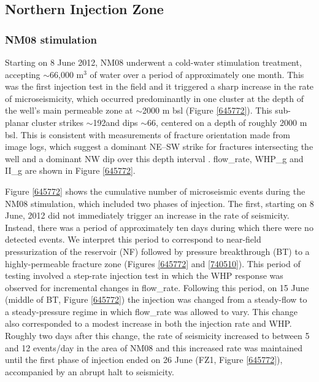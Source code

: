 \subsection{Northern Injection Zone}
\subsubsection{NM08 stimulation}\label{NM08_stimulation}
Starting on 8 June 2012, NM08 underwent a cold-water \gls{stimulation} treatment, accepting $\sim$66,000 m$^3$ of water over a period of approximately one month. This was the first injection test in the field and it triggered a sharp increase in the rate of microseismicity, which occurred predominantly in one cluster at the depth of the well's main permeable zone at $\sim$2000 m bsl (Figure \ref{645772}). This sub-planar cluster strikes $\sim$192\textdegree and dips $\sim$66\textdegree, centered on a depth of roughly 2000 m bsl. This is consistent with measurements of fracture orientation made from image logs, which suggest a dominant NE--SW strike for fractures intersecting the well and a dominant NW dip over this depth interval \citep{massiot_2012}. \Gls{flow_rate}, \gls{WHP_g} and \gls{II_g} are shown in Figure \ref{645772}.

Figure \ref{645772} shows the cumulative number of microseismic events during the NM08 stimulation, which included two phases of injection. The first, starting on 8 June, 2012 did not immediately trigger an increase in the rate of seismicity. Instead, there was a period of approximately ten days during which there were no detected events. We interpret this period to correspond to near-field pressurization of the reservoir (NF) followed by pressure breakthrough (BT) to a highly-permeable fracture zone (Figures \ref{645772} and \ref{740510}). This period of testing involved a step-rate injection test in which the \acrshort{WHP} response was observed for incremental changes in \gls{flow_rate}. Following this period, on 15 June (middle of BT, Figure \ref{645772}) the injection was changed from a steady-flow to a steady-pressure regime in which \gls{flow_rate} was allowed to vary. This change also corresponded to a modest increase in both the injection rate and \acrshort{WHP}. Roughly two days after this change, the rate of seismicity increased to between 5 and 12 events/day in the area of NM08 and this increased rate was maintained until the first phase of injection ended on 26 June (FZ1, Figure \ref{645772}), accompanied by an abrupt halt to seismicity.

